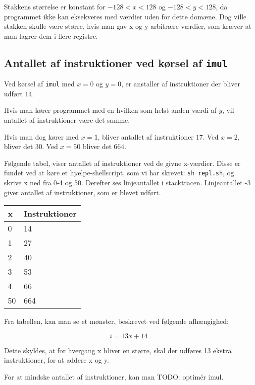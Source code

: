 \documentclass[12pt,a4paper]{article}
\newcommand{\imul}{\texttt{imul}}
\begin{document}
Stakkens størrelse er konstant for $-128 < x < 128$ og $-128 < y < 128$, da programmet ikke kan eksekveres med værdier uden for dette domæne. Dog ville stakken skulle være større, hvis man gav x og y arbitrære værdier, som kræver at man lagrer dem i flere registre.

\subsection{Antallet af instruktioner ved kørsel af \imul{}}
Ved kørsel af \imul{} med $x=0$ og $y=0$, er anstaller af instruktioner der bliver udført $14$.

Hvis man kører programmet med en hvilken som helst anden værdi af $y$, vil antallet af instruktioner være det samme.

Hvis man dog kører med $x=1$, bliver antallet af instruktioner $17$. Ved $x=2$, bliver det $30$. Ved $x=50$ bliver det $664$.

Følgende tabel, viser antallet af instruktioner ved de givne x-værdier. Disse er fundet ved at køre et hjælpe-shellscript, som vi har skrevet: \texttt{sh repl.sh}, og skrive x ned fra 0-4 og 50. Derefter ses linjeantallet i stacktracen. Linjeantallet -3 giver antallet af instruktioner, som er blevet udført.

\begin{tabular}{|l|l|}
\hline
x  & Instruktioner \\ \hline
0  & 14  \\ \hline
1  & 27  \\ \hline
2  & 40  \\ \hline
3  & 53  \\ \hline
4  & 66  \\ \hline
50 & 664 \\ \hline

\end{tabular}

Fra tabellen, kan man se et mønster, beskrevet ved følgende afhængighed:

\[
	i = 13x + 14
\]

Dette skyldes, at for hvergang x bliver en større, skal der udføres 13 ekstra instruktioner, for at addere x og y.

For at mindske antallet af instruktioner, kan man TODO: optimér imul.
\end{document}

